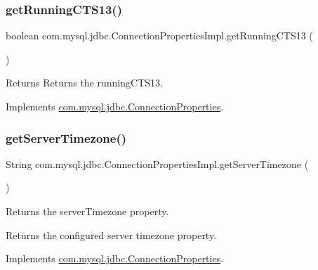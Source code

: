 \subsubsection{\texorpdfstring{get\+Running\+C\+T\+S13()}{getRunningCTS13()}}
{\footnotesize\ttfamily boolean com.\+mysql.\+jdbc.\+Connection\+Properties\+Impl.\+get\+Running\+C\+T\+S13 (\begin{DoxyParamCaption}{ }\end{DoxyParamCaption})}

\begin{DoxyReturn}{Returns}
Returns the running\+C\+T\+S13. 
\end{DoxyReturn}


Implements \mbox{\hyperlink{interfacecom_1_1mysql_1_1jdbc_1_1_connection_properties_ac861d675728756c06dd2984057b95ab6}{com.\+mysql.\+jdbc.\+Connection\+Properties}}.

\mbox{\label{classcom_1_1mysql_1_1jdbc_1_1_connection_properties_impl_a7539092effc8c4091173c772afe7e1c4}} 
\subsubsection{\texorpdfstring{get\+Server\+Timezone()}{getServerTimezone()}}
{\footnotesize\ttfamily String com.\+mysql.\+jdbc.\+Connection\+Properties\+Impl.\+get\+Server\+Timezone (\begin{DoxyParamCaption}{ }\end{DoxyParamCaption})}

Returns the \textquotesingle{}server\+Timezone\textquotesingle{} property.

\begin{DoxyReturn}{Returns}
the configured server timezone property. 
\end{DoxyReturn}


Implements \mbox{\hyperlink{interfacecom_1_1mysql_1_1jdbc_1_1_connection_properties_a488c241668bba62e720eea31fde52512}{com.\+mysql.\+jdbc.\+Connection\+Properties}}.

\mbox{\label{classcom_1_1mysql_1_1jdbc_1_1_connection_properties_impl_a923b692f97529931ec6f85a2e2e66249}} 
